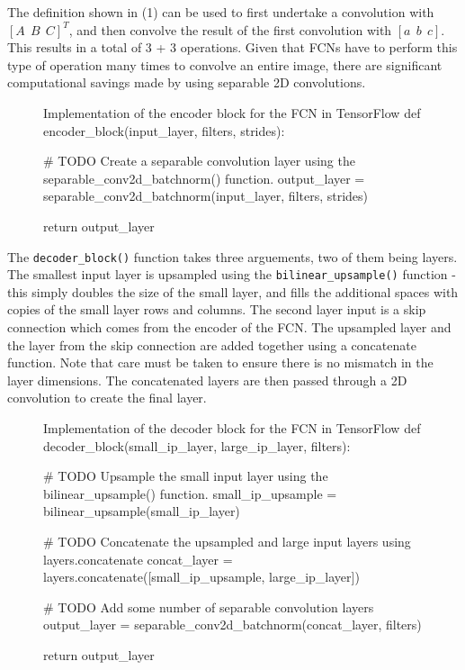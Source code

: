 \documentclass[a4paper]{article}
\begin{document}
The definition shown in (1) can be used to first undertake a convolution with $[A \ \ B \ \ C]^T$, and then convolve the result of the first convolution with $[a \ \ b \ \ c]$. This results in a total of 3 + 3 operations. Given that FCNs have to perform this type of operation many times to convolve an entire image, there are significant computational savings made by using separable 2D convolutions.
   
\begin{figure}[h]\scriptsize
\begin{sexylisting}{Implementation of the encoder block for the FCN in TensorFlow}
def encoder_block(input_layer, filters, strides):
    
    # TODO Create a separable convolution layer using the separable_conv2d_batchnorm() function.
    output_layer = separable_conv2d_batchnorm(input_layer, filters, strides)
    
    return output_layer
\end{sexylisting}
\end{figure}

The \verb|decoder_block()| function takes three arguements, two of them being layers. The smallest input layer is upsampled using the \verb|bilinear_upsample()| function - this simply doubles the size of the small layer, and fills the additional spaces with copies of the small layer rows and columns. The second layer input is a skip connection which comes from the encoder of the FCN. The upsampled layer and the layer from the skip connection are added together using a concatenate function. Note that care must be taken to ensure there is no mismatch in the layer dimensions. The concatenated layers are then passed through a 2D convolution to create the final layer.  

\begin{figure}[h]\scriptsize
\begin{sexylisting}{Implementation of the decoder block for the FCN in TensorFlow}
def decoder_block(small_ip_layer, large_ip_layer, filters):
    
    # TODO Upsample the small input layer using the bilinear_upsample() function.
    small_ip_upsample = bilinear_upsample(small_ip_layer)
    
    # TODO Concatenate the upsampled and large input layers using layers.concatenate
    concat_layer = layers.concatenate([small_ip_upsample, large_ip_layer])
    
    # TODO Add some number of separable convolution layers
    output_layer = separable_conv2d_batchnorm(concat_layer, filters)
    
    return output_layer
\end{sexylisting}
\end{figure}
\end{document}

